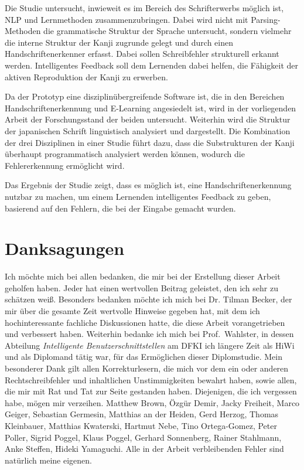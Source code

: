 Die Studie untersucht, inwieweit es im Bereich des Schrifterwerbs möglich ist, 
NLP und Lernmethoden zusammenzubringen. Dabei wird nicht mit Parsing-Methoden die 
grammatische Struktur der Sprache untersucht, sondern vielmehr die interne Struktur 
der Kanji zugrunde gelegt und durch einen Handschriftenerkenner erfasst. 
Dabei sollen Schreibfehler strukturell erkannt werden. Intelligentes Feedback soll 
dem Lernenden dabei helfen, die Fähigkeit der aktiven Reproduktion der Kanji zu 
erwerben.

Da der Prototyp eine disziplinübergreifende Software ist, 
die in den Bereichen Handschriftenerkennung und E-Learning angesiedelt ist,
wird in der vorliegenden Arbeit der Forschungsstand der beiden untersucht.
Weiterhin wird die Struktur der japanischen Schrift linguistisch analysiert und
dargestellt. Die Kombination der drei Disziplinen in einer Studie führt dazu, 
dass die Substrukturen der Kanji überhaupt programmatisch analysiert werden können,
wodurch die Fehlererkennung ermöglicht wird.

Das Ergebnis der Studie zeigt, dass es möglich ist, eine Handschriftenerkennung
nutzbar zu machen, um einem Lernenden intelligentes Feedback zu geben,
basierend auf den Fehlern, die bei der Eingabe gemacht wurden.

\chapter*{Danksagungen}
\label{chap:danksagungen}

Ich möchte mich bei allen bedanken, die mir bei der Erstellung dieser Arbeit 
geholfen haben. Jeder hat einen wertvollen Beitrag geleistet, 
den ich sehr zu schätzen weiß. Besonders bedanken möchte ich mich bei 
Dr. Tilman Becker, der mir über die gesamte Zeit wertvolle Hinweise gegeben hat, mit dem ich 
hochinteressante fachliche Diskussionen hatte, die diese Arbeit vorangetrieben
und verbessert haben. Weiterhin bedanke ich mich bei Prof.\ Wahlster, in dessen 
Abteilung \emph{Intelligente Benutzerschnittstellen} am DFKI ich längere Zeit als HiWi 
und als Diplomand tätig war, für das Ermöglichen dieser Diplomstudie.
Mein besonderer Dank gilt allen Korrekturlesern, die mich vor dem ein oder anderen
Rechtschreibfehler und inhaltlichen Unstimmigkeiten bewahrt haben, sowie allen,
die mir mit Rat und Tat zur Seite gestanden haben. Diejenigen, 
die ich vergessen habe, mögen mir verzeihen.
Matthew Brown,
Özgür Demir,
Jacky Freiheit,
Marco Geiger,
Sebastian Germesin,
Matthias an der Heiden,
Gerd Herzog,
Thomas Kleinbauer,
Matthias Kwaterski, 
Hartmut Nebe,
Tino Ortega-Gomez,
Peter Poller,
Sigrid Poggel,
Klaus Poggel,
Gerhard Sonnenberg,
Rainer Stahlmann,
Anke Steffen,    
Hideki Yamaguchi.  
Alle in der Arbeit verbleibenden Fehler sind natürlich meine eigenen.